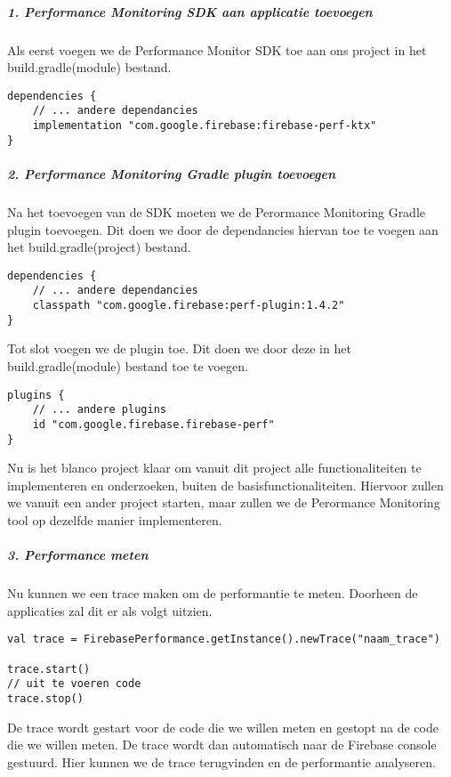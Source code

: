 \subparagraph{1. Performance Monitoring SDK aan applicatie toevoegen}
Als eerst voegen we de Performance Monitor SDK toe aan ons project in het build.gradle(module) bestand.
\begin{verbatim}
dependencies {
    // ... andere dependancies
    implementation "com.google.firebase:firebase-perf-ktx"
}
\end{verbatim}

\subparagraph{2. Performance Monitoring Gradle plugin toevoegen}
Na het toevoegen van de SDK moeten we de Perormance Monitoring Gradle plugin toevoegen. 
Dit doen we door de dependancies hiervan toe te voegen aan het build.gradle(project) bestand.
\begin{verbatim}
dependencies {
    // ... andere dependancies
    classpath "com.google.firebase:perf-plugin:1.4.2"
}
\end{verbatim}
Tot slot voegen we de plugin toe. Dit doen we door deze in het build.gradle(module) bestand toe te voegen.
\begin{verbatim}
plugins {
    // ... andere plugins
    id "com.google.firebase.firebase-perf"
}
\end{verbatim}
Nu is het blanco project klaar om vanuit dit project alle functionaliteiten te 
implementeren en onderzoeken, buiten de basisfunctionaliteiten. Hiervoor zullen we vanuit een ander project starten, 
maar zullen we de Perormance Monitoring tool op dezelfde manier implementeren.

\subparagraph{3. Performance meten}
Nu kunnen we een trace maken om de performantie te meten. Doorheen de applicaties zal dit er als 
volgt uitzien.
\begin{verbatim}
val trace = FirebasePerformance.getInstance().newTrace("naam_trace")

trace.start()
// uit te voeren code
trace.stop()
\end{verbatim}
De trace wordt gestart voor de code die we willen meten en gestopt na de code die we willen meten.
De trace wordt dan automatisch naar de Firebase console gestuurd. Hier kunnen we de trace terugvinden
en de performantie analyseren.